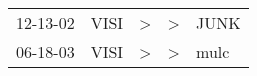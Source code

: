 \begin{supertabular}{lllll}
 12-13-02 &  VISI &  \textgreater &  \textgreater &  JUNK \\
 06-18-03 &  VISI &  \textgreater &  \textgreater &  mulc \\
\end{supertabular}
